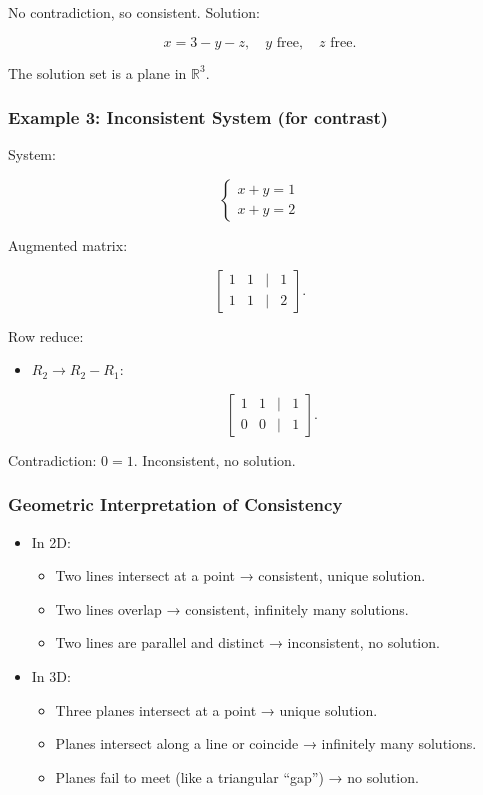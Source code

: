 \documentclass[
  letterpaper,
  DIV=11,
  numbers=noendperiod]{scrreprt}
\providecommand{\tightlist}{%
  \setlength{\itemsep}{0pt}\setlength{\parskip}{0pt}}
\begin{document}
No contradiction, so consistent. Solution:

\[
x = 3 - y - z, \quad y \text{ free}, \quad z \text{ free}.
\]

The solution set is a plane in \(\mathbb{R}^3\).

\subsubsection{Example 3: Inconsistent System (for
contrast)}\label{example-3-inconsistent-system-for-contrast}

System:

\[
\begin{cases}  
x + y = 1 \\  
x + y = 2  
\end{cases}
\]

Augmented matrix:

\[
\begin{bmatrix}  
1 & 1 & | & 1 \\  
1 & 1 & | & 2  
\end{bmatrix}.
\]

Row reduce:

\begin{itemize}
\item
  \(R_2 \to R_2 - R_1\):

  \[
  \begin{bmatrix}  
  1 & 1 & | & 1 \\  
  0 & 0 & | & 1  
  \end{bmatrix}.
  \]
\end{itemize}

Contradiction: \(0 = 1\). Inconsistent, no solution.

\subsubsection{Geometric Interpretation of
Consistency}\label{geometric-interpretation-of-consistency}

\begin{itemize}
\item
  In 2D:

  \begin{itemize}
  \tightlist
  \item
    Two lines intersect at a point → consistent, unique solution.
  \item
    Two lines overlap → consistent, infinitely many solutions.
  \item
    Two lines are parallel and distinct → inconsistent, no solution.
  \end{itemize}
\item
  In 3D:

  \begin{itemize}
  \tightlist
  \item
    Three planes intersect at a point → unique solution.
  \item
    Planes intersect along a line or coincide → infinitely many
    solutions.
  \item
    Planes fail to meet (like a triangular ``gap'') → no solution.
  \end{itemize}
\end{itemize}
\end{document}

